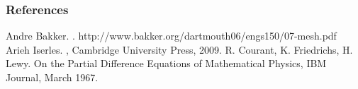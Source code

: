 \documentclass[mathserif,handout]{beamer} %
\begin{document}
\begin{frame}[allowframebreaks]
  \frametitle<presentation>{References}    
  \begin{thebibliography}{10}    
  \beamertemplateonlinebibitems
   Andre Bakker.
    .
   \newblock http://www.bakker.org/dartmouth06/engs150/07-mesh.pdf
  \beamertemplatebookbibitems
   Arieh Iserles.
    ,
   \newblock Cambridge University Press, 2009.
     \beamertemplatearticlebibitems
 R. Courant, K. Friedrichs, H. Lewy.
  \newblock On the Partial Difference Equations of Mathematical Physics,
 \newblock IBM Journal, March 1967.
 \end{thebibliography}

\end{frame}%
\end{document}
